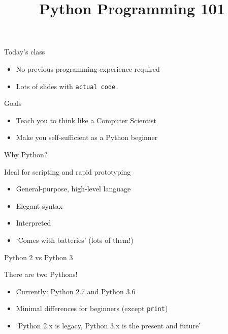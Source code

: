 

\title{Python Programming 101}



\maketitle

\begin{frame}{Today's class}
    \begin{itemize}
        \item No previous programming experience required
        \item Lots of slides with \texttt{actual code}
    \end{itemize}
    \vfill
    \begin{block}{Goals}
        \begin{itemize}
            \item Teach you to think like a Computer Scientist
            \item Make you self\hyp{}sufficient as a Python beginner
        \end{itemize}
    \end{block}
\end{frame}

\begin{frame}[fragile]{Why Python?}
    \begin{block}{Ideal for scripting and rapid prototyping}
        \begin{itemize}
            \item General\hyp{}purpose, high\hyp{}level language
            \item Elegant syntax
            \item Interpreted
            \item `Comes with batteries' (lots of them!)
        \end{itemize}
    \end{block}
\end{frame}

\begin{frame}{Python 2 vs Python 3}
    \begin{block}{There are two Pythons!}
        \begin{itemize}
            \item Currently: Python 2.7 and Python 3.6
            \item Minimal differences for beginners
                  (except \texttt{print})
            \item `Python 2.x is legacy, Python 3.x is the present and future'
        \end{itemize}
    \end{block}
\end{frame}

